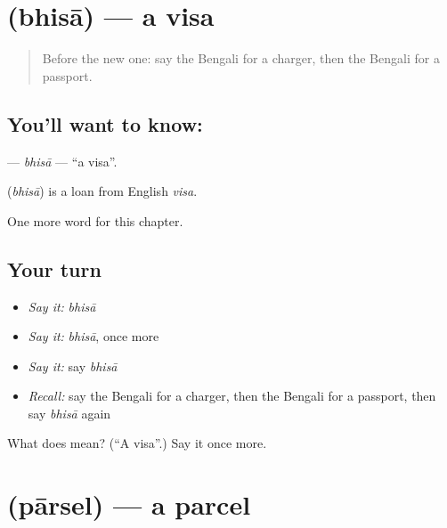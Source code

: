 \section[\texorpdfstring{\bn{ভিসা} (bhisā)}{ভিসা (bhisā)}]{ (bhisā) — a visa}

\label{lesson:BN-C248-bhisa}



\begin{quote}
Before the new one: say the Bengali for a charger, then the Bengali for a passport.
\end{quote}

\subsection*{You'll want to know: }
\textbf{} — \emph{bhisā} — \textquotedblleft{}a visa\textquotedblright{}.

\begin{cousinweb}
\textbf{} (\emph{bhisā}) is a loan from English \emph{visa}.
\end{cousinweb}

\begin{grammarlens}[title={What you've built}]
One more word for this chapter.
\end{grammarlens}

\subsection*{Your turn}
\begin{itemize}
\raggedright
  \item \emph{Say it:} \emph{bhisā}
  \item \emph{Say it:} \emph{bhisā}, once more
  \item \emph{Say it:} say \emph{bhisā}
  \item \emph{Recall:} say the Bengali for a charger, then the Bengali for a passport, then say \emph{bhisā} again
\end{itemize}

\begin{tcolorbox}[breakable,colback=teal!4,colframe=teal!35!black,title={Before you move on}]
What does  mean? (\textquotedblleft{}A visa\textquotedblright{}.) Say it once more.
\end{tcolorbox}
\section[\texorpdfstring{\bn{পার্সেল} (pārsel)}{পার্সেল (pārsel)}]{ (pārsel) — a parcel}

